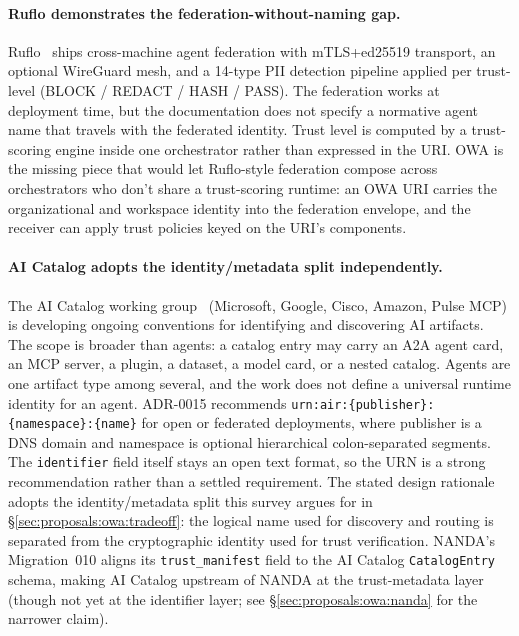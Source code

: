 \paragraph{Ruflo demonstrates the federation-without-naming gap.}
Ruflo~\cite{ruflo} ships cross-machine agent federation
with mTLS+ed25519 transport, an optional WireGuard mesh,
and a 14-type PII detection pipeline applied per
trust-level (BLOCK / REDACT / HASH / PASS). The federation
works at deployment time, but the documentation does not
specify a normative agent name that travels with the
federated identity. Trust level is computed by a
trust-scoring engine inside one orchestrator rather than
expressed in the URI. OWA is the missing piece that would
let Ruflo-style federation compose across orchestrators
who don't share a trust-scoring runtime: an OWA URI
carries the organizational and workspace identity into the
federation envelope, and the receiver can apply
trust policies keyed on the URI's components.

\paragraph{AI Catalog adopts the identity/metadata split independently.}
The AI Catalog working group~\cite{ai_catalog} (Microsoft,
Google, Cisco, Amazon, Pulse MCP) is developing ongoing
conventions for identifying and discovering AI artifacts.
The scope is broader than agents: a catalog entry may carry
an A2A agent card, an MCP server, a plugin, a dataset, a
model card, or a nested catalog. Agents are one artifact
type among several, and the work does not define a universal
runtime identity for an agent. ADR-0015 recommends
\texttt{urn:air:\{publisher\}:\{namespace\}:\{name\}} for
open or federated deployments, where publisher is a DNS
domain and namespace is optional hierarchical
colon-separated segments. The \texttt{identifier} field
itself stays an open text format, so the URN is a strong
recommendation rather than a settled requirement. The stated
design rationale adopts the identity/metadata split this
survey argues for in \S\ref{sec:proposals:owa:tradeoff}: the
logical name used for discovery and routing is separated
from the cryptographic identity used for trust verification.
NANDA's Migration~010 aligns its \texttt{trust\_manifest}
field to the AI Catalog \texttt{CatalogEntry} schema,
making AI Catalog upstream of NANDA at the
trust-metadata layer (though not yet at the identifier
layer; see \S\ref{sec:proposals:owa:nanda} for the
narrower claim).

